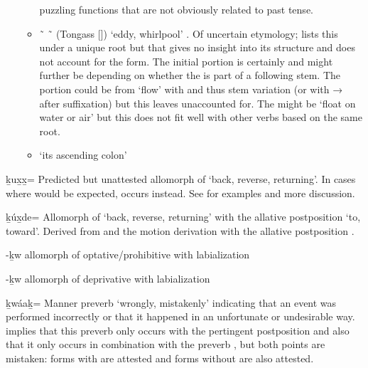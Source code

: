 \begin{morphdesc}[resume*=alphalist]
\begin{enumerate}
\begin{itemize}
				puzzling functions that are not obviously related to past tense.
		\item	{} \~\  \~\ 
				(Tongass  [])
				 ‘eddy, whirlpool’
				 \parencites[04/192]{leer:1973}[19]{leer:1978b}[M·91]{leer-hitch-ritter:2001}.
			Of uncertain etymology; \textcites{leer:1973}{leer:1978b} lists this under a
				unique root 
				but that gives no insight into its structure
				and does not account for the  form.
			The initial portion is certainly 
				and might further be 
				depending on whether the  is part of a following stem.
			The  portion could be from  ‘flow’
				\parencites[05/1]{leer:1973}[313]{leer:1976}
				with  and thus  stem variation
				(or  with → after suffixation)
				but this leaves  unaccounted for.
			The  might be  ‘float on water or air’
				\parencites[03/299]{leer:1973}[235]{leer:1976}
				but this does not fit well with other verbs based on the same root.
		\item	{} ‘its ascending colon’
			\parencite[M·122]{leer-hitch-ritter:2001}
		\end{itemize}
	\end{enumerate}


\item[\llap{*}ḵux̱x̱=]\label{m:ḵux̱x̱=}
	Predicted but unattested allomorph of  ‘back, reverse, returning’.
	In cases where  would be expected,  occurs instead.
	See  for examples and more discussion.

\item[ḵúx̱de=]\label{m:ḵúx̱de=}
	Allomorph of  ‘back, reverse, returning’
		with the allative postposition  ‘to, toward’.
	Derived from  and the motion derivation
		with the allative postposition .

\item[-ḵw]\label{m:-ḵw-optphib}
	allomorph of optative/prohibitive  with labialization

\item[-ḵw]\label{m:-ḵw-dprv}
	allomorph of deprivative  with labialization

\item[ḵwáaḵ=]\label{m:ḵwáaḵ=}
	Manner preverb ‘wrongly, mistakenly’ indicating that an event was performed incorrectly
		or that it happened in an unfortunate or undesirable way.
	\textcite[134, 297]{leer:1991} implies that this preverb
		only occurs with the pertingent postposition 
		and also that it only occurs in combination with the preverb ,
		but both points are mistaken: forms with  are attested
		and forms without  are also attested.
	

\end{morphdesc}
